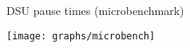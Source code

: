 \begin{frame}{DSU pause times (microbenchmark)}%
\begin{center}%
\texttt{[image: graphs/microbench]}%
\end{center}%
\end{frame}


